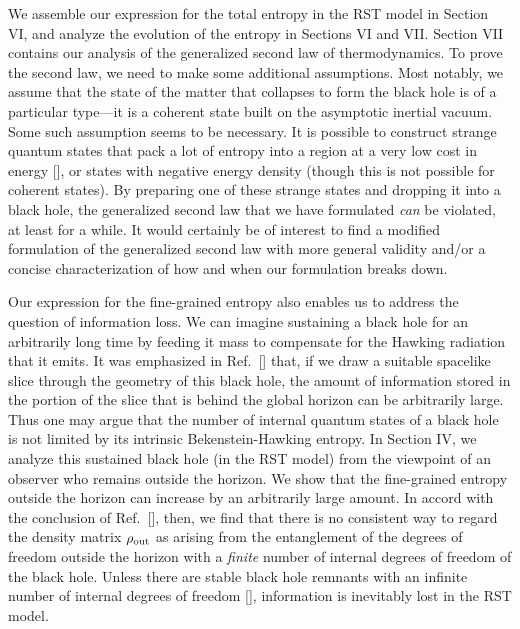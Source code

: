 We assemble our expression for the total entropy in the RST model in Section
VI,
and analyze the evolution of the entropy in Sections VI and VII.  Section VII
contains our analysis of the generalized second law of thermodynamics.  To
prove the second law, we need to make some additional assumptions.  Most
notably, we assume that the state of the matter that collapses to form the
black hole is of a particular type---it is a coherent state built on the
asymptotic inertial vacuum.  Some such assumption seems to be necessary.  It is
possible to construct strange quantum states that pack a lot of entropy into a
region at a very low cost in energy
[\cite{holzhey,wilczek}], or states with negative energy density (though
this is not possible for coherent states).  By
preparing one of these strange states and dropping it into a black hole, the
generalized second law that we have formulated {\it can} be violated, at least
for a while. It would certainly be of interest to find a modified formulation
of the generalized second law
with more general validity and/or a concise characterization of how and when
our formulation breaks down.

Our expression for the fine-grained entropy also enables us to address the
question of information loss.  We can imagine sustaining a black hole for an
arbitrarily long time by feeding it mass to compensate for the Hawking
radiation that it emits.  It was emphasized in Ref.~[\cite{stromtriv}] that, if
we draw a suitable spacelike slice through the geometry of this black hole, the
amount of information stored in the portion of the slice that is behind the
global horizon can be arbitrarily large.  Thus one may argue that the number of
internal quantum states of a black hole is not limited by its intrinsic
Bekenstein-Hawking entropy.  In Section IV, we analyze this sustained black
hole
(in the RST model) from the viewpoint of an observer who remains outside the
horizon.  We show that the fine-grained entropy outside the horizon can
increase by an arbitrarily large amount.  In accord with the conclusion of
Ref.~[\cite{stromtriv}], then, we find that there is no consistent way to
regard the density matrix $\rho_{\rm out}$ as arising from the entanglement of
the degrees of freedom outside the horizon with a {\it finite} number of
internal degrees of freedom of the black hole.  Unless there are stable black
hole remnants with an infinite number of internal degrees of freedom
[\cite{remnant}], information is inevitably lost in the RST model.

